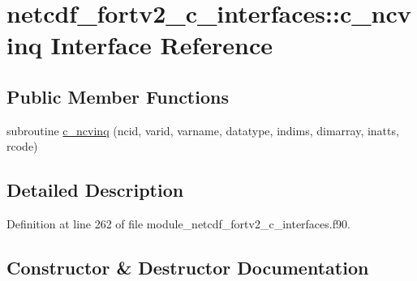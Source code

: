 \hypertarget{interfacenetcdf__fortv2__c__interfaces_1_1c__ncvinq}{}\section{netcdf\+\_\+fortv2\+\_\+c\+\_\+interfaces\+:\+:c\+\_\+ncvinq Interface Reference}
\label{interfacenetcdf__fortv2__c__interfaces_1_1c__ncvinq}
\subsection*{Public Member Functions}
\begin{DoxyCompactItemize}
\item 
subroutine \hyperlink{interfacenetcdf__fortv2__c__interfaces_1_1c__ncvinq_a95c377a7642fad63e8197520cce52a3a}{c\+\_\+ncvinq} (ncid, varid, varname, datatype, indims, dimarray, inatts, rcode)
\end{DoxyCompactItemize}


\subsection{Detailed Description}


Definition at line 262 of file module\+\_\+netcdf\+\_\+fortv2\+\_\+c\+\_\+interfaces.\+f90.



\subsection{Constructor \& Destructor Documentation}
\mbox{\label{interfacenetcdf__fortv2__c__interfaces_1_1c__ncvinq_a95c377a7642fad63e8197520cce52a3a}} 
